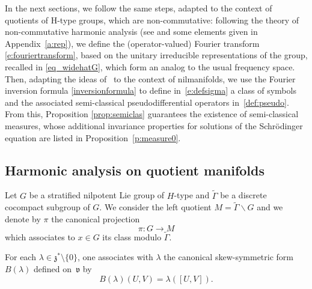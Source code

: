 \documentclass[JEP,XML,SOM,Unicode,published]{cedram}
\theoremstyle{plain}
\theoremstyle{definition}
\begin{document}
In the next sections, we follow the same steps, adapted to the context of quotients of H-type groups, which are non-commutative: following the theory of non-commutative harmonic analysis (see \cite{CG,Tay} and some elements given in Appendix~\ref{a:rep}), we define the (operator-valued) Fourier transform \eqref{e:fouriertransform}, based on the unitary irreducible representations of the group, recalled in \eqref{eq_widehatG}, which form an analog to the usual frequency space. Then, adapting the ideas of~\cite{FF1} to the context of nilmanifolds, we use the Fourier inversion formula \eqref{inversionformula} to define in~\eqref{e:defsigma} a class of symbols and the associated semi-classical pseudodifferential operators in~\eqref{def:pseudo}. From this, Proposition \ref{prop:semiclas} guarantees the existence of semi-classical measures, whose additional invariance properties for solutions of the Schrödinger equation are listed in Proposition~\ref{p:measure0}.

\subsection{Harmonic analysis on quotient manifolds}

Let $G$ be a stratified nilpotent Lie group of $H$-type and $\widetilde{\Gamma}$ be a discrete cocompact subgroup of $G$. We consider the left quotient $M=\widetilde{\Gamma}\backslash G$ and we denote by
$\pi$ the canonical projection
\[
\pi:G\to M
\]
which associates to $x\in G$ its class modulo $\widetilde{\Gamma}$.

For each $\lambda \in \mathfrak z^*\setminus\{0\}$, one associates with $\lambda$ the canonical skew-symmetric form $B(\lambda)$ defined on~$\mathfrak v$ by
\[
B(\lambda)(U,V)= \lambda([U,V]).
\]
\end{document}
